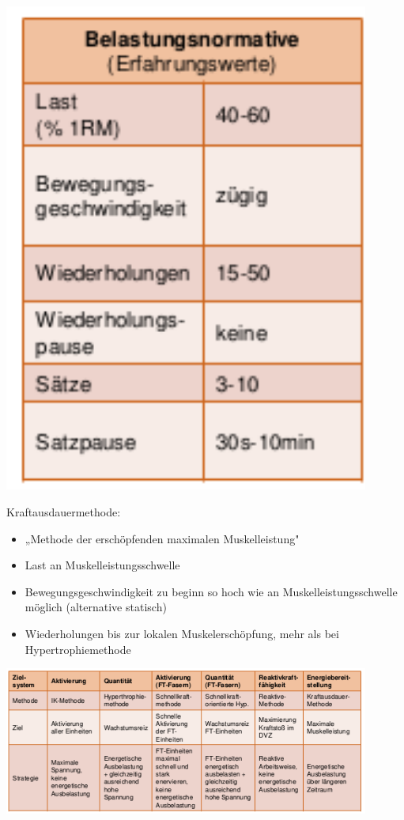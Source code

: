 \begin{minipage}{0.3\textwidth}
    \includegraphics[width=0.9\textwidth]{pictures/kraftausdauermethode}
\end{minipage}
\begin{minipage}{0.7\textwidth}
Kraftausdauermethode:
\begin{itemize}
    \item „Methode der erschöpfenden maximalen Muskelleistung"
    \item Last an Muskelleistungsschwelle
    \item Bewegungsgeschwindigkeit zu beginn so hoch wie an Muskelleistungsschwelle möglich (alternative statisch)
    \item Wiederholungen bis zur lokalen Muskelerschöpfung, mehr als bei Hypertrophiemethode
\end{itemize}
\end{minipage}

\includegraphics[width=0.9\textwidth]{pictures/zusammenfassung_kraft_methoden}

